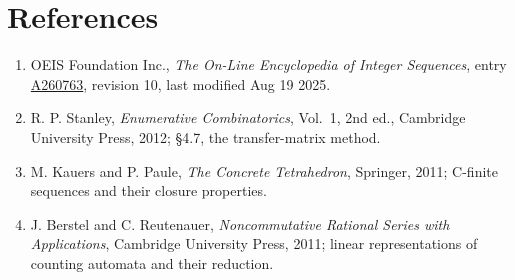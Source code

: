 \documentclass[11pt]{article}
\theoremstyle{definition}
\begin{document}
\section{References}

\begin{enumerate}

\item OEIS Foundation Inc., \emph{The On-Line Encyclopedia of Integer Sequences}, entry \href{https://oeis.org/A260763}{A260763}, revision 10, last modified Aug 19 2025.

\item R. P. Stanley, \emph{Enumerative Combinatorics}, Vol.~1, 2nd ed., Cambridge University Press, 2012; \S4.7, the transfer-matrix method.

\item M. Kauers and P. Paule, \emph{The Concrete Tetrahedron}, Springer, 2011; C-finite sequences and their closure properties.

\item J. Berstel and C. Reutenauer, \emph{Noncommutative Rational Series with Applications}, Cambridge University Press, 2011; linear representations of counting automata and their reduction.

\end{enumerate}
\end{document}

